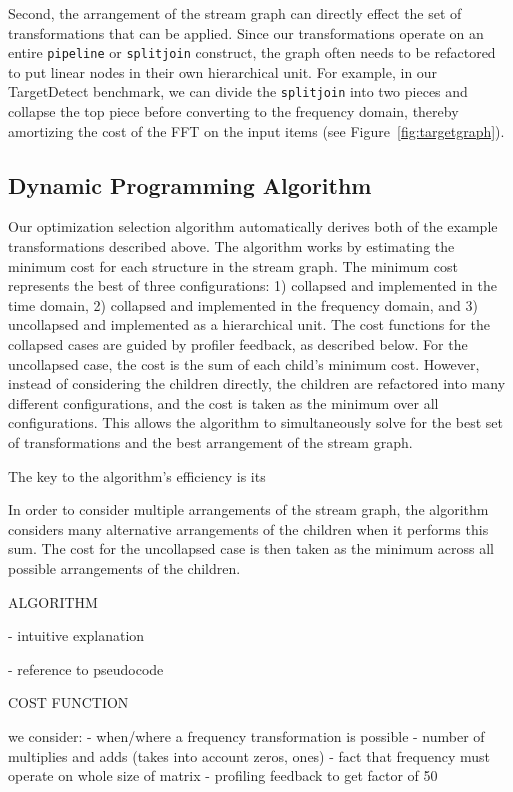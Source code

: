 Second, the arrangement of the stream graph can directly effect the
set of transformations that can be applied.  Since our transformations
operate on an entire {\tt pipeline} or {\tt splitjoin} construct, the
graph often needs to be refactored to put linear nodes in their own
hierarchical unit.  For example, in our TargetDetect benchmark, we can
divide the {\tt splitjoin} into two pieces and collapse the top piece
before converting to the frequency domain, thereby amortizing the cost
of the FFT on the input items (see Figure~\ref{fig:targetgraph}).

\subsection{Dynamic Programming Algorithm}

Our optimization selection algorithm automatically derives both of the
example transformations described above.  The algorithm works by
estimating the minimum cost for each structure in the stream graph.
The minimum cost represents the best of three configurations: 1)
collapsed and implemented in the time domain, 2) collapsed and
implemented in the frequency domain, and 3) uncollapsed and
implemented as a hierarchical unit.  The cost functions for the
collapsed cases are guided by profiler feedback, as described below.
For the uncollapsed case, the cost is the sum of each child's minimum
cost.  However, instead of considering the children directly, the
children are refactored into many different configurations, and the
cost is taken as the minimum over all configurations.  This allows the
algorithm to simultaneously solve for the best set of transformations
and the best arrangement of the stream graph.

The key to the algorithm's efficiency is its 

In order to consider multiple arrangements of the stream graph, the
algorithm considers many alternative arrangements of the children when
it performs this sum.  The cost for the uncollapsed case is then taken
as the minimum across all possible arrangements of the children.

ALGORITHM

- intuitive explanation

- reference to pseudocode

COST FUNCTION

we consider:
  - when/where a frequency transformation is possible
  - number of multiplies and adds (takes into account zeros, ones)
  - fact that frequency must operate on whole size of matrix
  - profiling feedback to get factor of 50

